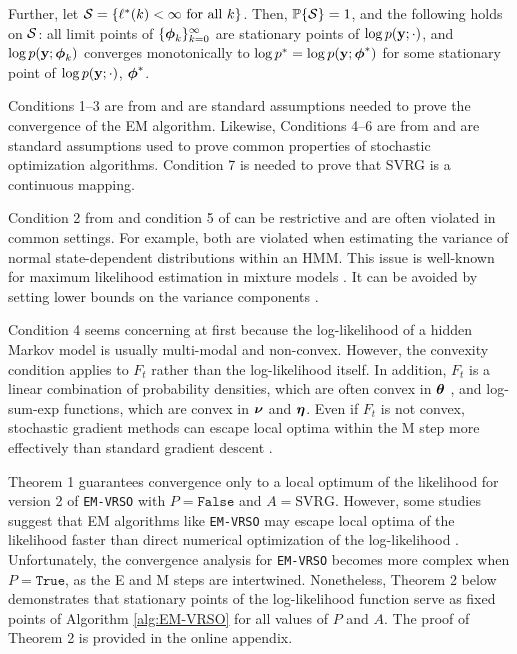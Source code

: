 \begin{theorem}
    Further, let $\mathcal{S} = \{\ell^*(k) < \infty \text{ for all } k \}$. Then, $\mathbb{P}\{\mathcal{S}\} = 1$, and the following holds on $\mathcal{S}$: all limit points of $\{\boldsymbol{\phi}_{k}\}_{k=0}^\infty$  are stationary points of $\log p(\mathbf{y};\cdot)$, and $\log p(\mathbf{y};\boldsymbol{\phi}_{k})$ converges monotonically to $\log p^* = \log p(\mathbf{y};\boldsymbol{\phi}^*)$ for some stationary point of $\log p(\mathbf{y};\cdot)$, $\boldsymbol{\phi}^*$.
\end{theorem}

Conditions 1--3 are from \citet{Wu:1983} and are standard assumptions needed to prove the convergence of the EM algorithm. Likewise, Conditions 4--6 are from \citet{Johnson:2013} and are standard assumptions used to prove common properties of stochastic optimization algorithms. Condition 7 is needed to prove that SVRG is a continuous mapping.

Condition 2 from \citet{Wu:1983} and condition 5 of \citet{Johnson:2013} can be restrictive and are often violated in common settings. For example, both are violated when estimating the variance of normal state-dependent distributions within an HMM. This issue is well-known for maximum likelihood estimation in mixture models \citep{Chen:2009,Liu:2015b}. It can be avoided by setting lower bounds on the variance components \citep{Zucchini:2016}. 

Condition 4 seems concerning at first because the log-likelihood of a hidden Markov model is usually multi-modal and non-convex. However, the convexity condition applies to $F_t$ rather than the log-likelihood itself. In addition, $F_t$ is a linear combination of probability densities, which are often convex in $\boldsymbol{\theta}$ \citep{Boyd:2004}, and log-sum-exp functions, which are convex in $\boldsymbol{\nu}$ and $\boldsymbol{\eta}$. Even if $F_t$ is not convex, stochastic gradient methods can escape local optima within the M step more effectively than standard gradient descent \citep{Kleinberg:2018}.

Theorem 1 guarantees convergence only to a local optimum of the likelihood for version 2 of \texttt{EM-VRSO} with $P = \texttt{False}$ and $A = \text{SVRG}$. However, some studies suggest that EM algorithms like \texttt{EM-VRSO} may escape local optima of the likelihood faster than direct numerical optimization of the log-likelihood \citep{Zhang:2020}.
%
Unfortunately, the convergence analysis for \texttt{EM-VRSO} becomes more complex when $P = \texttt{True}$, as the E and M steps are intertwined. Nonetheless, Theorem 2 below demonstrates that stationary points of the log-likelihood function serve as fixed points of Algorithm \ref{alg:EM-VRSO} for all values of $P$ and $A$. The proof of Theorem 2 is provided in the online appendix.

